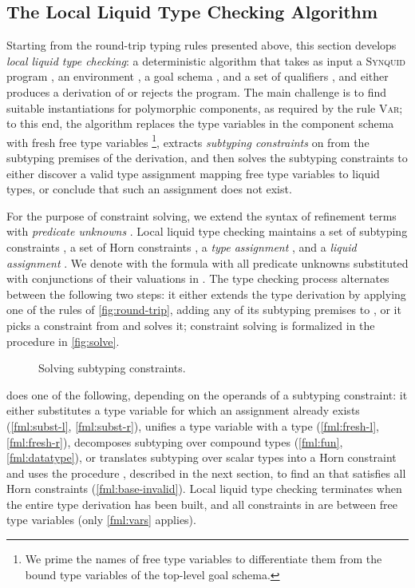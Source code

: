 \documentclass[10pt,preprint]{sigplanconf-pldi16}
\theoremstyle{definition}
\newcommand{\lang}{\textsc{Synquid}\xspace}
\begin{document}
\subsection{The Local Liquid Type Checking Algorithm}\label{sec:theory:subtyping}

Starting from the round-trip typing rules presented above,
this section develops \emph{local liquid type checking}:
a deterministic algorithm that takes as input a \lang program , an environment , a goal schema , and a set of qualifiers ,
and either produces a derivation of  or rejects the program.
The main challenge is to find suitable instantiations for polymorphic components, as required by the rule \textsc{Var};
to this end, the algorithm replaces the type variables  in the component schema with fresh free type variables \footnote{We prime the names of free type variables to differentiate them from the bound type variables of the top-level goal schema.},
extracts \emph{subtyping constraints} on  from the subtyping premises of the derivation,
and then solves the subtyping constraints 
to either discover a valid type assignment mapping free type variables to liquid types, or conclude that such an assignment does not exist.

For the purpose of constraint solving, we extend the syntax of refinement terms with \emph{predicate unknowns} .
Local liquid type checking maintains a set of subtyping constraints ,
a set of Horn constraints ,
a \emph{type assignment} ,
and a \emph{liquid assignment} .
We denote with  the formula  with all predicate unknowns substituted with conjunctions of their valuations in .
The type checking process alternates between the following two steps:
it either extends the type derivation by applying one of the rules of \autoref{fig:round-trip},
adding any of its subtyping premises to ,
or it picks a constraint  from  and solves it;
constraint solving is formalized in the procedure  in \autoref{fig:solve}.

\begin{figure}
\small

\vspace{-7mm}

\caption{Solving subtyping constraints.}\label{fig:solve}
\end{figure}

 does one of the following, depending on the operands of a subtyping constraint:
it either substitutes a type variable for which an assignment already exists (\autoref{fml:subst-l}, \autoref{fml:subst-r}),
unifies a type variable with a type (\autoref{fml:fresh-l}, \autoref{fml:fresh-r}),
decomposes subtyping over compound types (\autoref{fml:fun}, \autoref{fml:datatype}),
or translates subtyping over scalar types into a Horn constraint 
and uses the procedure , described in the next section, to find an  that satisfies all Horn constraints (\autoref{fml:base-invalid}).
Local liquid type checking terminates when the entire type derivation has been built,
and all constraints in  are between free type variables (only \autoref{fml:vars} applies).
\end{document}
